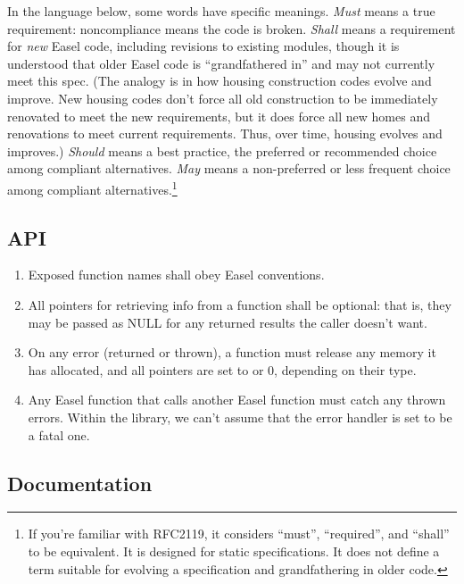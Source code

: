 In the language below, some words have specific meanings. \emph{Must}
means a true requirement: noncompliance means the code is
broken. \emph{Shall} means a requirement for \emph{new} Easel code,
including revisions to existing modules, though it is understood that
older Easel code is ``grandfathered in'' and may not currently meet
this spec. (The analogy is in how housing construction codes evolve
and improve. New housing codes don't force all old construction to be
immediately renovated to meet the new requirements, but it does force
all new homes and renovations to meet current requirements. Thus, over
time, housing evolves and improves.)  \emph{Should} means a best
practice, the preferred or recommended choice among compliant
alternatives. \emph{May} means a non-preferred or less frequent choice
among compliant alternatives.\footnote{If you're familiar with
RFC2119, it considers ``must'', ``required'', and ``shall'' to be
equivalent. It is designed for static specifications. It does not
define a term suitable for evolving a specification and grandfathering
in older code.}

\subsection{API}

\begin{enumerate}
\item Exposed function names shall obey Easel conventions.

\item All  pointers for retrieving info from a function
      shall be optional: that is, they may be passed as NULL for
      any returned results the caller doesn't want.
      
\item On any error (returned or thrown), a function must release any
      memory it has allocated, and all  pointers are set
      to  or 0, depending on their type.

\item Any Easel function that calls another Easel function must catch
      any thrown errors. Within the library, we can't assume that the
      error handler is set to be a fatal one.
\end{enumerate}


\subsection{Documentation}

